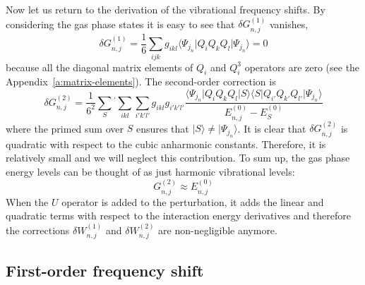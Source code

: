 \documentclass[a4paper,titlepage,twoside,fleqn,12pt]{book}
\begin{document}
\begin{refsection}
Now let us return to the derivation of the vibrational frequency shifts. 
By considering the gas phase states it is easy to see that 
$\delta G_{n,j}^{(1)}$ vanishes,
%
\begin{equation}
\delta G_{n,j}^{(1)} = \frac{1}{6}\sum_{ijk} g_{ikl} 
\langle \Psi_{j_n} \vert Q_iQ_kQ_l \vert \Psi_{j_n} \rangle = 0
\end{equation}
%
because all the diagonal matrix elements of $Q_i$ and $Q_i^3$ operators
are zero (see the Appendix~\ref{a:matrix-elements}).
The second-order correction is 
%
\begin{equation}
\delta G_{n,j}^{(2)} = \frac{1}{6^2} \sum_{S}{^{'}} \sum_{ikl}\sum_{i'k'l'} g_{ikl} g_{i'k'l'}
\frac{\langle \Psi_{j_n} \vert Q_iQ_kQ_l \vert S \rangle \langle S \vert Q_{i'}Q_{k'}Q_{l'} \vert \Psi_{j_n} \rangle }
{ E_{n,j}^{(0)} - E_{S}^{(0)} }
\end{equation}
%
where the primed sum over $S$ ensures that $\vert S \rangle \ne \vert \Psi_{j_n} \rangle$. 
It is clear that $\delta G_{n,j}^{(2)}$ is quadratic with respect to the cubic anharmonic constants.
Therefore, it is relatively small and we will neglect this contribution.
To sum up, the gas phase energy levels can be thought of as just 
harmonic vibrational levels:
%
\begin{equation}\label{e:ge}
G_{n,j}^{(2)} \approx E_{n,j}^{(0)}
\end{equation}
%
When the $U$ operator is added to the perturbation, it adds the linear
and quadratic terms with respect to the interaction energy derivatives and therefore
the corrections $\delta W_{n,j}^{(1)}$ and $\delta W_{n,j}^{(2)}$ 
are non\hyp{}negligible anymore.

\subsection{First-order frequency shift}


\end{refsection}
\end{document}
